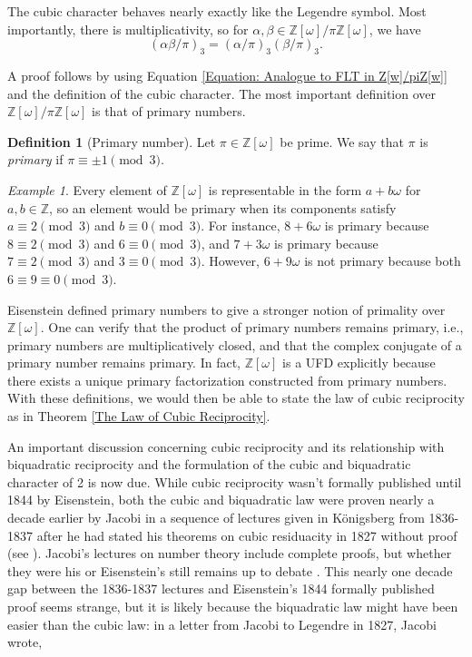 \documentclass[10pt]{amsart}
\newcommand{\ZZ}{\mathbb{Z}}
\theoremstyle{plain}
\theoremstyle{definition}
\newtheorem{defn}{Definition}
\theoremstyle{remark}
\newtheorem{ex}{Example}
\numberwithin{equation}{section}
\begin{document}
The cubic character behaves nearly exactly like the Legendre symbol. Most importantly, there is multiplicativity, so for $\alpha,\beta\in\ZZ[\omega]/\pi\ZZ[\omega]$, we have 
\begin{equation}
    (\alpha\beta/\pi)_{3} = (\alpha/\pi)_{3}(\beta/\pi)_{3}. \label{Equation: multiplicativity of cubic character}
\end{equation}

A proof follows by using Equation \eqref{Equation: Analogue to FLT in Z[w]/piZ[w]} and the definition of the cubic character. The most important definition over $\ZZ[\omega]/\pi\ZZ[\omega]$ is that of primary numbers. 

\begin{defn}[Primary number]
    Let $\pi\in\ZZ[\omega]$ be prime. We say that $\pi$ is \textit{primary} if $\pi\equiv \pm 1\pmod{3}$. 
\end{defn}

\begin{ex}
    Every element of $\ZZ[\omega]$ is representable in the form $a+b\omega$ for $a,b\in\ZZ$, so an element would be primary when its components satisfy $a\equiv 2\pmod{3}$ and $b\equiv 0\pmod{3}$. For instance, $8+6\omega$ is primary because $8\equiv 2\pmod{3}$ and $6\equiv 0\pmod{3}$, and $7+3\omega$ is primary because $7\equiv 2\pmod{3}$ and $3\equiv 0\pmod{3}$. However, $6+9\omega$ is not primary because both $6\equiv 9\equiv 0\pmod{3}$. 
\end{ex}

Eisenstein defined primary numbers to give a stronger notion of primality over $\ZZ[\omega]$. One can verify that the product of primary numbers remains primary, i.e., primary numbers are multiplicatively closed, and that the complex conjugate of a primary number remains primary. In fact, $\ZZ[\omega]$ is a UFD explicitly because there exists a unique primary factorization constructed from primary numbers. With these definitions, we would then be able to state the law of cubic reciprocity as in Theorem \ref{The Law of Cubic Reciprocity}. 

\indent An important discussion concerning cubic reciprocity and its relationship with biquadratic reciprocity and the formulation of the cubic and biquadratic character of 2 is now due. While cubic reciprocity wasn't formally published until 1844 by Eisenstein, both the cubic and biquadratic law were proven nearly a decade earlier by Jacobi in a sequence of lectures given in Königsberg from 1836-1837 after he had stated his theorems on cubic residuacity in 1827 without proof (see \cite[pg. 200]{lemmermeyer2000reciprocity}). Jacobi's lectures on number theory include complete proofs, but whether they were his or Eisenstein's still remains up to debate \cite{jacobi2007vorlesungen}. This nearly one decade gap between the 1836-1837 lectures and Eisenstein's 1844 formally published proof seems strange, but it is likely because the biquadratic law might have been easier than the cubic law: in a letter from Jacobi to Legendre in 1827, Jacobi wrote,
\end{document}
